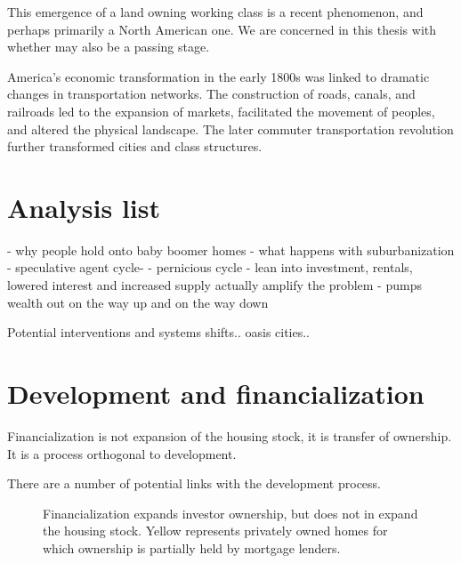 This emergence of a land owning working class is a recent phenomenon, and perhaps primarily a North American one. We are concerned in this thesis with whether may also be a passing stage.

America's economic transformation in the early 1800s was linked to dramatic changes in transportation networks. The construction of roads, canals, and railroads led to the expansion of markets, facilitated the movement of peoples, and altered the physical landscape. The later commuter transportation revolution further transformed cities and class structures.



\section{Analysis list}

- why people hold onto baby boomer homes
- what happens with suburbanization
- speculative agent cycle- 
- pernicious cycle - lean into investment, rentals, lowered interest and increased supply actually amplify the problem
- pumps wealth out on the way up and on the way down


Potential interventions and systems shifts.. oasis cities..



\section{Development and financialization}

Financialization is not expansion of the housing stock, it is transfer of ownership. It is a process orthogonal to development.

There are a number of potential links with the development process.

\begin{figure}
\begin{center}

\end{center}
\caption{Financialization expands investor ownership, but does not in expand the housing stock. Yellow represents privately owned homes for which ownership is partially held by mortgage lenders.}
\label{fig-financialization-expansion}
\end{figure}

